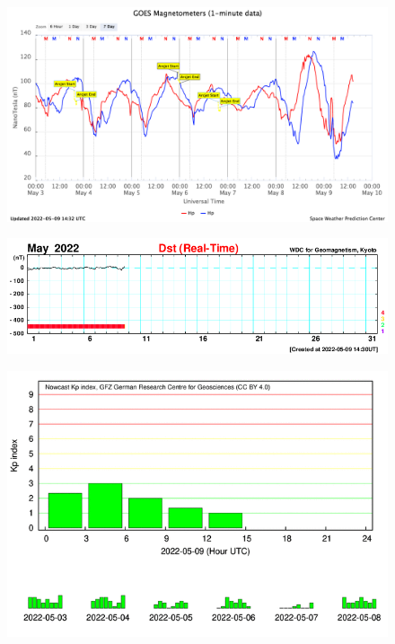 \documentclass[a4paper, 10pt]{article}
\begin{document}
                     \begin{figure}[H]
    
                        \centering
   
                             \includegraphics[width=14cm]{./figures//figureGeomag_4.png}

                        \end{figure}

                     \begin{figure}[H]
    
                        \centering
   
                             \includegraphics[width=14cm]{./figures//figureGeomag_5.png}

                        \end{figure}

                     \begin{figure}[H]
    
                        \centering
   
                             \includegraphics[width=14cm]{./figures//figureGeomag_6.png}

                        \end{figure}
\end{document}
